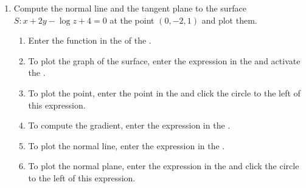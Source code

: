\begin{enumerate}[leftmargin=*]
\item Compute the normal line and the tangent plane to the surface $S: x+2y-\log z +4 =0$ at the point $(0,-2,1)$ and plot them.
      \begin{indication}
      \begin{enumerate}
      \item Enter the function  in the  of the .
      \item To plot the graph of the surface, enter the expression  in the  and activate the .
      \item To plot the point, enter the point  in the   and click the circle to the left of this expression.
      \item To compute the gradient, enter the expression  in the .
      \item To plot the normal line, enter the expression  in the .
      \item To plot the normal plane, enter the expression  in the  and click the circle to the left of this expression.
      \end{enumerate}
      \end{indication}


\end{enumerate}
